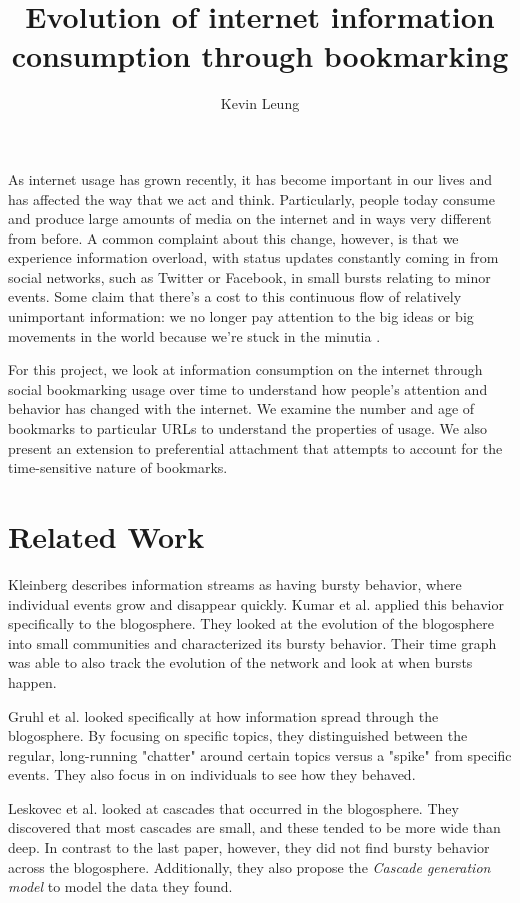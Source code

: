 \documentclass[11pt]{amsart}
\title{Evolution of internet information consumption through bookmarking}
\author{Kevin Leung}
\begin{document}
\maketitle
As internet usage has grown recently, it has become important in our lives and has affected the way that we act and think. Particularly, people today consume and produce large amounts of media on the internet and in ways very different from before. A common complaint about this change, however, is that we experience information overload, with status updates constantly coming in from social networks, such as Twitter or Facebook, in small bursts relating to minor events. Some claim that there's a cost to this continuous flow of relatively unimportant information: we no longer pay attention to the big ideas or big movements in the world because we're stuck in the minutia \cite{big-idea} \cite{egypt}. 

For this project, we look at information consumption on the internet through social bookmarking usage over time to understand how people's attention and behavior has changed with the internet. We examine the number and age of bookmarks to particular URLs to understand the properties of usage. We also present an extension to preferential attachment that attempts to account for the time-sensitive nature of bookmarks.

\section{Related Work}
Kleinberg \cite{bursty-original} describes information streams as having bursty behavior, where individual events grow and disappear quickly. Kumar et al. \cite{bursty} applied this behavior specifically to the blogosphere. They looked at the evolution of the blogosphere into small communities and characterized its bursty behavior. Their time graph was able to also track the evolution of the network and look at when bursts happen. 

Gruhl et al. \cite{gruhl} looked specifically at how information spread through the blogosphere. By focusing on specific topics, they distinguished between the regular, long-running "chatter" around certain topics versus a "spike" from specific events. They also focus in on individuals to see how they behaved.

Leskovec et al. \cite{cascade} looked at cascades that occurred in the blogosphere. They discovered that most cascades are small, and these tended to be more wide than deep. In contrast to the last paper, however, they did not find bursty behavior across the blogosphere. Additionally, they also propose the \textit{Cascade generation model} to model the data they found.
\end{document}
